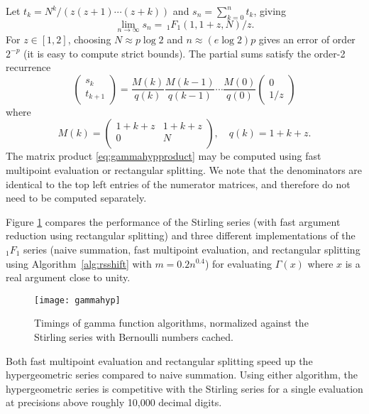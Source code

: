 \documentclass{sig-alternate}
\begin{document}
Let $t_k = N^k / (z (z+1) \cdots (z+k))$ and $s_n = \sum_{k=0}^n t_k$,
giving
$$\lim_{n\to\infty} s_n = \,_1F_1(1,1+z,N) / z.$$
For $z \in [1,2]$, choosing
$N \approx p \log 2$ and $n \approx (e \log 2) p$
gives an error of order $2^{-p}$ (it
is easy to compute strict bounds). The partial sums
satisfy the order-2 recurrence
\begin{equation}
\begin{pmatrix} s_k \\ t_{k+1} \end{pmatrix} =
\frac{M(k)}{q(k)} \frac{M(k-1)}{q(k-1)} \cdots \frac{M(0)}{q(0)}
\label{eq:gammahypproduct}
\begin{pmatrix} 0 \\ 1/z \end{pmatrix}
\end{equation}
where
\begin{equation}
M(k) =
\begin{pmatrix}
1+k+z & 1+k+z \\
0     & N     \\
\end{pmatrix}, \quad
q(k) = 1+k+z.
\end{equation}
The matrix product \eqref{eq:gammahypproduct} may be computed
using fast multipoint evaluation
or rectangular splitting. We note that the denominators
are identical to the top left entries of the numerator matrices,
and therefore do not need to be computed separately.

Figure \ref{fig:gammahyp} compares
the performance of the Stirling series (with fast argument reduction using rectangular splitting)
and three different implementations of the ${}_1F_1$ series (naive summation,
fast multipoint evaluation, and rectangular splitting
using Algorithm~\ref{alg:rsshift} with $m = 0.2 n^{0.4}$)
for evaluating $\Gamma(x)$ where $x$ is a real argument
close to unity.

\begin{figure}[width=8cm] \label{fig:gammahyp}
\begin{center}
\texttt{[image: gammahyp]}
\caption{Timings of gamma function algorithms,
normalized against the Stirling series with Bernoulli numbers cached.}
\end{center}
\end{figure}

Both fast multipoint evaluation and rectangular splitting
speed up the hypergeometric series
compared to naive summation.
Using either algorithm, the
hypergeometric series is competitive with the Stirling
series for a single evaluation
at precisions above roughly 10,000 decimal digits.
\end{document}

